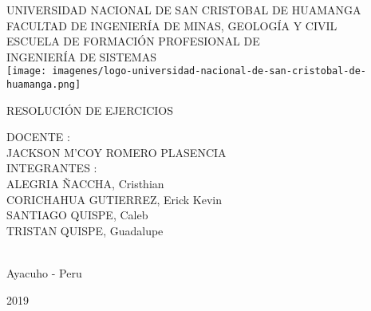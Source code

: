 \documentclass[10pt,a4paper]{article}
\begin{document}
\begin{center}
\Large{UNIVERSIDAD NACIONAL DE SAN CRISTOBAL DE HUAMANGA}\\
\vspace{1cm}
\Large{FACULTAD DE INGENIERÍA DE MINAS, GEOLOGÍA Y CIVIL}\\
\vspace{1cm}
\Large{ESCUELA DE FORMACIÓN PROFESIONAL DE}\\
\Large{INGENIERÍA DE SISTEMAS}\\
\texttt{[image: imagenes/logo-universidad-nacional-de-san-cristobal-de-huamanga.png]}
  
\vspace{1cm}
\Large{RESOLUCIÓN DE EJERCICIOS}\\
\vspace{1cm}
\end{center}
\Large{DOCENTE :}\\
\vspace{1cm}
\hspace*{5cm}\Large{JACKSON M’COY ROMERO PLASENCIA}\\
\Large{INTEGRANTES :}\\
\vspace{0.3cm}
\hspace*{5cm}\Large{ALEGRIA ÑACCHA, Cristhian}\\
\vspace{0.3cm}
\hspace*{5cm}\Large{CORICHAHUA GUTIERREZ, Erick Kevin}\\
\vspace{0.3cm}
\hspace*{5cm}\Large{SANTIAGO QUISPE, Caleb}\\
\vspace{0.3cm}
\hspace*{5cm}\Large{TRISTAN QUISPE, Guadalupe}\\
\vspace{0.3cm}
\vspace*{3cm}\\
\Large\centerline{Ayacuho - Peru}
\Large\centerline{2019} 
\newpage
\end{document}
